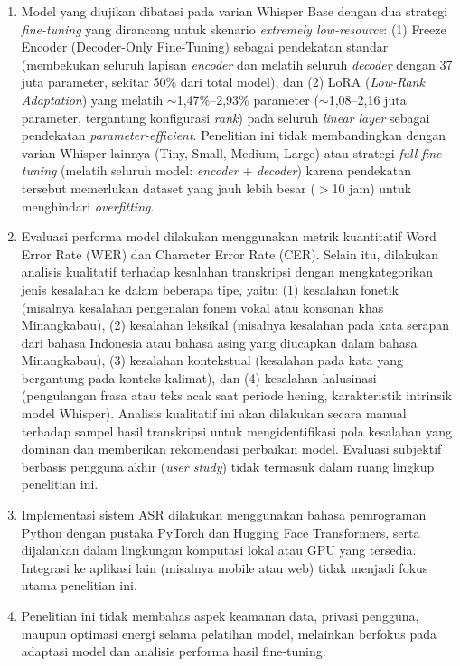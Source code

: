 \begin{enumerate}
    \item Model yang diujikan dibatasi pada varian Whisper Base dengan dua strategi \textit{fine-tuning} yang dirancang untuk skenario \textit{extremely low-resource}: (1) Freeze Encoder (Decoder-Only Fine-Tuning) sebagai pendekatan standar (membekukan seluruh lapisan \textit{encoder} dan melatih seluruh \textit{decoder} dengan 37 juta parameter, sekitar 50\% dari total model), dan (2) LoRA (\textit{Low-Rank Adaptation}) yang melatih $\sim$1,47\%--2,93\% parameter ($\sim$1,08--2,16 juta parameter, tergantung konfigurasi \textit{rank}) pada seluruh \textit{linear layer} sebagai pendekatan \textit{parameter-efficient}. Penelitian ini tidak membandingkan dengan varian Whisper lainnya (Tiny, Small, Medium, Large) atau strategi \textit{full fine-tuning} (melatih seluruh model: \textit{encoder} + \textit{decoder}) karena pendekatan tersebut memerlukan dataset yang jauh lebih besar ($>$10 jam) untuk menghindari \textit{overfitting}.

    \item Evaluasi performa model dilakukan menggunakan metrik kuantitatif Word Error Rate (WER) dan Character Error Rate (CER). Selain itu, dilakukan analisis kualitatif terhadap kesalahan transkripsi dengan mengkategorikan jenis kesalahan ke dalam beberapa tipe, yaitu: (1) kesalahan fonetik (misalnya kesalahan pengenalan fonem vokal atau konsonan khas Minangkabau), (2) kesalahan leksikal (misalnya kesalahan pada kata serapan dari bahasa Indonesia atau bahasa asing yang diucapkan dalam bahasa Minangkabau), (3) kesalahan kontekstual (kesalahan pada kata yang bergantung pada konteks kalimat), dan (4) kesalahan halusinasi (pengulangan frasa atau teks acak saat periode hening, karakteristik intrinsik model Whisper). Analisis kualitatif ini akan dilakukan secara manual terhadap sampel hasil transkripsi untuk mengidentifikasi pola kesalahan yang dominan dan memberikan rekomendasi perbaikan model. Evaluasi subjektif berbasis pengguna akhir (\textit{user study}) tidak termasuk dalam ruang lingkup penelitian ini.


    \item Implementasi sistem ASR dilakukan menggunakan bahasa pemrograman Python dengan pustaka PyTorch dan Hugging Face Transformers, serta dijalankan dalam lingkungan komputasi lokal atau GPU yang tersedia. Integrasi ke aplikasi lain (misalnya mobile atau web) tidak menjadi fokus utama penelitian ini.
    
    \item Penelitian ini tidak membahas aspek keamanan data, privasi pengguna, maupun optimasi energi selama pelatihan model, melainkan berfokus pada adaptasi model dan analisis performa hasil fine-tuning.
\end{enumerate}


